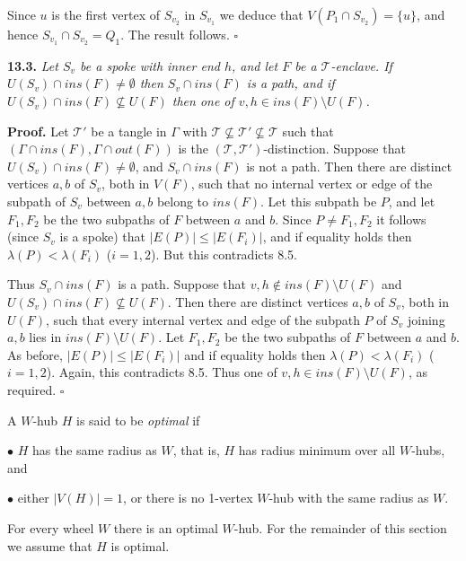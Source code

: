 Since $u$ is the first vertex of $S_{v_2}$ in $S_{v_1}$ we deduce that $V(P_1 \cap S_{v_2}) = \{u\}$, and hence $S_{v_1} \cap S_{v_2} = Q_1$. The result follows. $\square$

\textbf{13.3.} \textit{Let $S_v$ be a spoke with inner end $h$, and let $F$ be a $\mathscr{T}$-enclave. If $U(S_v) \cap ins(F) \ne \emptyset$ then $S_v \cap ins(F)$ is a path, and if $U(S_v) \cap ins(F) \nsubseteq U(F)$ then one of $v, h \in ins(F) \setminus U(F)$.}

\textbf{Proof.} Let $\mathscr{T}'$ be a tangle in $\Gamma$ with $\mathscr{T} \nsubseteq \mathscr{T}' \nsubseteq \mathscr{T}$ such that $(\Gamma \cap ins(F), \Gamma \cap out(F))$ is the $(\mathscr{T}, \mathscr{T}')$-distinction. Suppose that $U(S_v) \cap ins(F) \ne \emptyset$, and $S_v \cap ins(F)$ is not a path. Then there are distinct vertices $a, b$ of $S_v$, both in $V(F)$, such that no internal vertex or edge of the subpath of $S_v$ between $a, b$ belong to $ins(F)$. Let this subpath be $P$, and let $F_1, F_2$ be the two subpaths of $F$ between $a$ and $b$. Since $P \ne F_1, F_2$ it follows (since $S_v$ is a spoke) that $|E(P)| \le |E(F_i)|$, and if equality holds then $\lambda(P) < \lambda(F_i)$ ($i = 1, 2$). But this contradicts 8.5.

Thus $S_v \cap ins(F)$ is a path. Suppose that $v, h \notin ins(F) \setminus U(F)$ and $U(S_v) \cap ins(F) \nsubseteq U(F)$. Then there are distinct vertices $a, b$ of $S_v$, both in $U(F)$, such that every internal vertex and edge of the subpath $P$ of $S_v$ joining $a, b$ lies in $ins(F) \setminus U(F)$. Let $F_1, F_2$ be the two subpaths of $F$ between $a$ and $b$. As before, $|E(P)| \le |E(F_i)|$ and if equality holds then $\lambda(P) < \lambda(F_i)$ ($i = 1, 2$). Again, this contradicts 8.5. Thus one of $v, h \in ins(F) \setminus U(F)$, as required. $\square$

A $W$-hub $H$ is said to be \textit{optimal} if

\hspace*{12pt}$\bullet$ $H$ has the same radius as $W$, that is, $H$ has radius minimum over all $W$-hubs, and

\hspace*{12pt}$\bullet$ either $|V(H)| = 1$, or there is no 1-vertex $W$-hub with the same radius as $W$.

For every wheel $W$ there is an optimal $W$-hub. For the remainder of this section we assume that $H$ is optimal.

